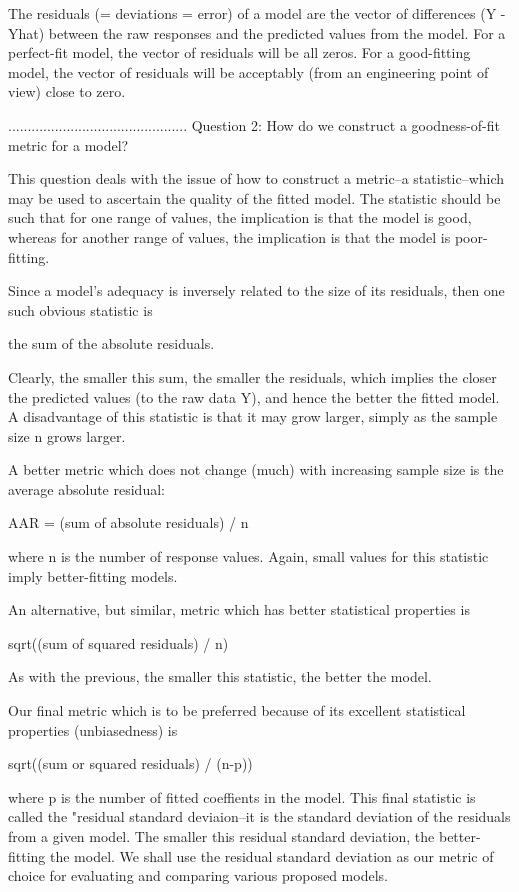 The residuals (= deviations = error) of a model
are the vector of differences (Y - Yhat) between
the raw responses and the predicted values from
the model.  For a perfect-fit model, the vector of
residuals will be all zeros.  For a good-fitting
model, the vector of residuals will be acceptably
(from an engineering point of view) close to zero.


..............................................
Question 2: How do we construct a goodness-of-fit metric
            for a model?

This question deals with the issue of how to
construct a metric--a statistic--which may be used
to ascertain the quality of the fitted model.  The
statistic should be such that for one range of
values, the implication is that the model is good,
whereas for another range of values, the
implication is that the model is poor-fitting.

Since a model's adequacy is inversely related to
the size of its residuals, then one such obvious
statistic is

   the sum of the absolute residuals.

Clearly, the smaller this sum, the smaller the
residuals, which implies the closer the predicted
values (to the raw data Y), and hence the better
the fitted model.  A disadvantage of this
statistic is that it may grow larger, simply as
the sample size n grows larger.

A better metric which does not change (much) with
increasing sample size is the average absolute
residual:

   AAR = (sum of absolute residuals) / n

where n is the number of response values.  Again,
small values for this statistic imply
better-fitting models.

An alternative, but similar, metric which has
better statistical properties is

   sqrt((sum of squared residuals) / n)

As with the previous, the smaller this statistic,
the better the model.

Our final metric which is to be preferred because
of its excellent statistical properties
(unbiasedness) is

   sqrt((sum or squared residuals) / (n-p))

where p is the number of fitted coeffients in the
model.  This final statistic is called the
"residual standard deviaion--it is the standard
deviation of the residuals from a given model.
The smaller this residual standard deviation, the
better-fitting the model.  We shall use the
residual standard deviation as our metric of
choice for evaluating and comparing various
proposed models.


